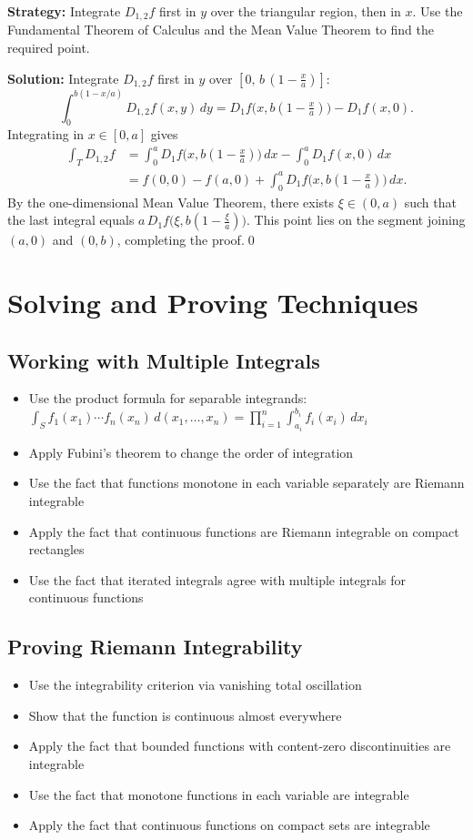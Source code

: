 \noindent\textbf{Strategy:} Integrate $D_{1,2}f$ first in $y$ over the triangular region, then in $x$. Use the Fundamental Theorem of Calculus and the Mean Value Theorem to find the required point.

\bigskip\noindent\textbf{Solution:}
Integrate $D_{1,2}f$ first in $y$ over $[0,\,b\,(1-\tfrac{x}{a})]$:
\[ \int_0^{b(1-x/a)} D_{1,2}f(x,y)\,dy = D_1 f\big(x, b(1-\tfrac{x}{a})\big) - D_1 f(x,0). \]
Integrating in $x\in[0,a]$ gives
\begin{align*}
 \int_T D_{1,2}f &= \int_0^a D_1 f\big(x, b(1-\tfrac{x}{a})\big)\,dx - \int_0^a D_1 f(x,0)\,dx \\ 
 &= f(0,0)-f(a,0) + \int_0^a D_1 f\big(x, b(1-\tfrac{x}{a})\big)\,dx. 
\end{align*}
By the one-dimensional Mean Value Theorem, there exists $\xi\in(0,a)$ such that the last integral equals $a\,D_1 f\big(\xi, b(1-\tfrac{\xi}{a})\big)$. This point lies on the segment joining $(a,0)$ and $(0,b)$, completing the proof.\qed

\section{Solving and Proving Techniques}

\subsection*{Working with Multiple Integrals}
\begin{itemize}
\item Use the product formula for separable integrands: $\int_S f_1(x_1) \cdots f_n(x_n) \, d(x_1, \ldots, x_n) = \prod_{i=1}^n \int_{a_i}^{b_i} f_i(x_i) \, dx_i$
\item Apply Fubini's theorem to change the order of integration
\item Use the fact that functions monotone in each variable separately are Riemann integrable
\item Apply the fact that continuous functions are Riemann integrable on compact rectangles
\item Use the fact that iterated integrals agree with multiple integrals for continuous functions
\end{itemize}

\subsection*{Proving Riemann Integrability}
\begin{itemize}
\item Use the integrability criterion via vanishing total oscillation
\item Show that the function is continuous almost everywhere
\item Apply the fact that bounded functions with content-zero discontinuities are integrable
\item Use the fact that monotone functions in each variable are integrable
\item Apply the fact that continuous functions on compact sets are integrable
\end{itemize}

